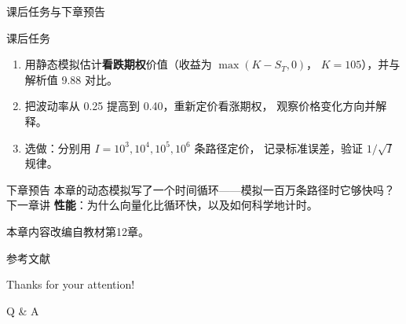 \documentclass[9pt]{ctexbeamer}
\begin{document}
\begin{frame}{课后任务与下章预告}
	\begin{block}{课后任务}
		\begin{enumerate}
			\item 用静态模拟估计\textbf{看跌期权}价值（收益为 $\max(K-S_T,0)$，
				$K=105$），并与解析值 9.88 对比。
			\item 把波动率从 0.25 提高到 0.40，重新定价看涨期权，
				观察价格变化方向并解释。
			\item 选做：分别用 $I=10^3, 10^4, 10^5, 10^6$ 条路径定价，
				记录标准误差，验证 $1/\sqrt{I}$ 规律。
		\end{enumerate}
	\end{block}
	\begin{exampleblock}{下章预告}
		本章的动态模拟写了一个时间循环——模拟一百万条路径时它够快吗？
		下一章讲 \textbf{性能}：为什么向量化比循环快，以及如何科学地计时。
	\end{exampleblock}
	\begin{center}
		\vspace{0.5em}
		本章内容改编自教材第12章\citep{hilpisch2018python}。
	\end{center}
\end{frame}


\appendix

\begin{frame}[allowframebreaks]{参考文献}
	
	
\end{frame}

\begin{frame}
	\begin{center}
		{\Huge\calligra Thanks for your attention!}
		\vspace{1cm}

		{\Huge Q \& A}
	\end{center}
\end{frame}
\end{document}
